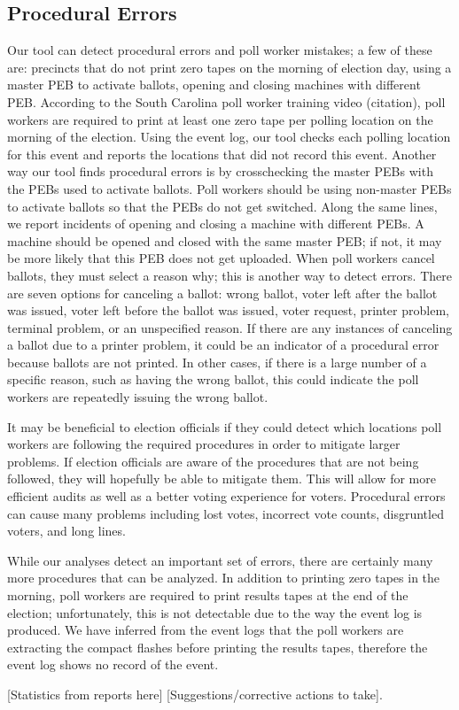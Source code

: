 \subsection{Procedural Errors}
Our tool can detect procedural errors and poll worker mistakes; a few of these are: precincts that do not print zero tapes on the morning of election day, using a master PEB to activate ballots, opening and closing machines with different PEB.  According to the South Carolina poll worker training video (citation), poll workers are required to print at least one zero tape per polling location on the morning of the election.  Using the event log, our tool checks each polling location for this event and reports the locations that did not record this event.  Another way our tool finds procedural errors is by crosschecking the master PEBs with the PEBs used to activate ballots.  Poll workers should be using non-master PEBs to activate ballots so that the PEBs do not get switched.  Along the same lines, we report incidents of opening and closing a machine with different PEBs.  A machine should be opened and closed with the same master PEB; if not, it may be more likely that this PEB does not get uploaded.   When poll workers cancel ballots, they must select a reason why; this is another way to detect errors.  There are seven options for canceling a ballot: wrong ballot, voter left after the ballot was issued, voter left before the ballot was issued, voter request, printer problem, terminal problem, or an unspecified reason.  If there are any instances of canceling a ballot due to a printer problem, it could be an indicator of a procedural error because ballots are not printed.  In other cases, if there is a large number of a specific reason, such as having the wrong ballot, this could indicate the poll workers are repeatedly issuing the wrong ballot.  

It may be beneficial to election officials if they could detect which locations poll workers are following the required procedures in order to mitigate larger problems.  If election officials are aware of the procedures that are not being followed, they will hopefully be able to mitigate them.  This will allow for more efficient audits as well as a better voting experience for voters.  Procedural errors can cause many problems including lost votes, incorrect vote counts, disgruntled voters, and long lines.

While our analyses detect an important set of errors, there are certainly many more procedures that can be analyzed.  In addition to printing zero tapes in the morning, poll workers are required to print results tapes at the end of the election; unfortunately, this is not detectable due to the way the event log is produced.  We have inferred from the event logs that the poll workers are extracting the compact flashes before printing the results tapes, therefore the event log shows no record of the event.  

[Statistics from reports here] [Suggestions/corrective actions to take].
